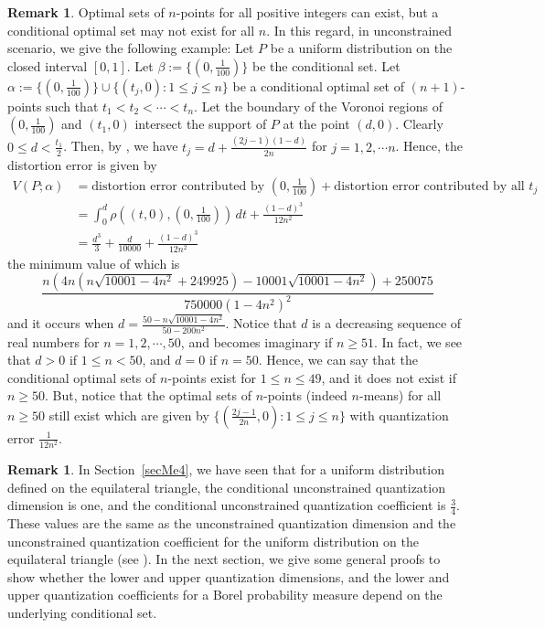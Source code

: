 \documentclass[12pt, reqno]{amsart}
\theoremstyle{plain}
\theoremstyle{definition}
\newtheorem{remark}[subsection]{Remark}
\newcommand{\uu}{\cup}%
\newcommand{\set}[1]{\{#1\}}%
\newcommand{\ga}{\alpha}
\newcommand{\gb}{\beta}
\newcommand{\te}{\text}%
\begin{document}
\begin{remark}
Optimal sets of $n$-points for all positive integers can exist, but a conditional optimal set may not exist for all $n$. In this regard, in unconstrained scenario, we give the following example:
Let $P$ be a uniform distribution on the closed interval $[0, 1]$.  Let $\gb:=\set{(0, \frac 1{100})}$ be the conditional set. Let $\ga:=\set{(0, \frac 1{100})}\uu \set{(t_j, 0) : 1\leq j\leq n}$ be a conditional optimal set of $(n+1)$-points such that $t_1<t_2<\cdots<t_n$. Let the boundary of the Voronoi regions of $(0, \frac 1{100})$ and $(t_1, 0)$ intersect the support of $P$ at the point $(d, 0)$. Clearly $0\leq d<\frac  {t_1}2$.
Then, by \cite[Theorem~2.1.1]{RR}, we have $t_j=d+\frac {(2j-1)(1-d)}{2n}$ for $j=1, 2, \cdots n$.  
Hence, the distortion error is given by 
\begin{align*}
V(P;\ga)&=\te{distortion error contributed by } (0, \frac 1{100}) +\te{distortion error contributed by all } t_j\\
&=\int_0^d \rho((t, 0), (0, \frac 1{100}))\,dt+\frac{(1-d)^3}{12 n^2}\\
&=\frac{d^3}{3}+\frac{d}{10000}+\frac{(1-d)^3}{12 n^2}
\end{align*}
the minimum value of which is 
\begin{equation*} \label{eqMe0001} \frac{n \left(4 n \left(n \sqrt{10001-4 n^2}+249925\right)-10001 \sqrt{10001-4 n^2}\right)+250075}{750000 \left(1-4 n^2\right)^2}
\end{equation*}
and it occurs when $d=\frac{50-n \sqrt{10001-4 n^2}}{50-200 n^2}$. 
Notice that $d$ is a decreasing sequence of real numbers for $n=1, 2, \cdots, 50$, and becomes imaginary if $n\geq 51$. In fact, we see that $d>0$ if $1\leq n<50$, and $d=0$ if $n=50$.   
Hence, we can say that the conditional optimal sets of $n$-points exist for $1\leq n\leq 49$, and it does not exist if $n\geq 50$. But, notice that the optimal sets of $n$-points (indeed $n$-means) for all $n\geq 50$ still exist which are given by $\set{(\frac{2j-1}{2n}, 0) : 1\leq j\leq n}$ with quantization error $\frac 1{12n^2}$. 
\end{remark} 



 


\begin{remark}
In Section~\ref{secMe4}, we have seen that for a uniform distribution defined on the equilateral triangle,  the conditional unconstrained quantization dimension is one, and the conditional unconstrained quantization coefficient is $\frac 34$. These values are the same as the unconstrained quantization dimension and the unconstrained quantization coefficient for the uniform distribution on the equilateral triangle (see \cite{RR}).  In the next section, we give some general proofs to show whether the lower and upper quantization dimensions, and the lower and upper quantization coefficients for a Borel probability measure depend on the underlying conditional set. 
\end{remark} 
\end{document}
